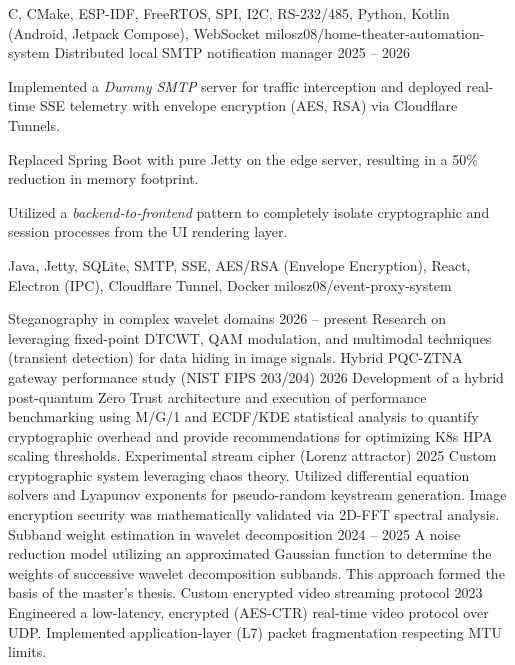   {C, CMake, ESP-IDF, FreeRTOS, SPI, I2C, RS-232/485, Python, Kotlin (Android, Jetpack Compose), WebSocket}
  {milosz08/home-theater-automation-system}
\AddProjectEntry
  {Distributed local SMTP notification manager}
  {2025 -- 2026}
  {%
    \item
      Implemented a \textit{Dummy SMTP} server for traffic interception and deployed real-time SSE telemetry with
      envelope encryption (AES, RSA) via Cloudflare Tunnels.
    \item
      Replaced Spring Boot with pure Jetty on the edge server, resulting in a 50\% reduction in memory footprint.
    \item
      Utilized a \textit{backend-to-frontend} pattern to completely isolate cryptographic and session processes from the
      UI rendering layer.
  }
  {Java, Jetty, SQLite, SMTP, SSE, AES/RSA (Envelope Encryption), React, Electron (IPC), Cloudflare Tunnel, Docker}
  {milosz08/event-proxy-system}


\newcommand{\IndependentResearchTitle}{Independent research}
\renewcommand{\ResearchList}{}
\AddResearchEntry
  {Steganography in complex wavelet domains}
  {2026 -- present}
  {%
    Research on leveraging fixed-point DTCWT, QAM modulation, and multimodal techniques (transient detection) for data
    hiding in image signals.
  }
\AddResearchEntry
  {Hybrid PQC-ZTNA gateway performance study (NIST FIPS 203/204)}
  {2026}
  {%
    Development of a hybrid post-quantum Zero Trust architecture and execution of performance benchmarking using M/G/1
    and ECDF/KDE statistical analysis to quantify cryptographic overhead and provide recommendations for optimizing K8s
    HPA scaling thresholds.
  }
\AddResearchEntry
  {Experimental stream cipher (Lorenz attractor)}
  {2025}
  {%
    Custom cryptographic system leveraging chaos theory. Utilized differential equation solvers and Lyapunov exponents
    for pseudo-random keystream generation. Image encryption security was mathematically validated via 2D-FFT spectral
    analysis.
  }
\AddResearchEntry
  {Subband weight estimation in wavelet decomposition}
  {2024 -- 2025}
  {%
    A noise reduction model utilizing an approximated Gaussian function to determine the weights of successive
    wavelet decomposition subbands. This approach formed the basis of the master's thesis.
  }
\AddResearchEntry
  {Custom encrypted video streaming protocol}
  {2023}
  {%
    Engineered a low-latency, encrypted (AES-CTR) real-time video protocol over UDP. Implemented application-layer (L7)
    packet fragmentation respecting MTU limits.
  }

